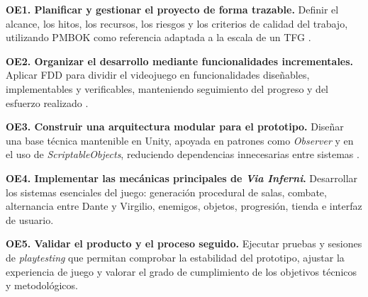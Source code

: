 \begin{description}
    \item \textbf{OE1. Planificar y gestionar el proyecto de forma trazable.} Definir el
    alcance, los hitos, los recursos, los riesgos y los criterios de calidad del trabajo,
    utilizando PMBOK como referencia adaptada a la escala de un TFG \cite{pmbok2021}.

    \item \textbf{OE2. Organizar el desarrollo mediante funcionalidades incrementales.}
    Aplicar FDD para dividir el videojuego en funcionalidades diseñables, implementables y
    verificables, manteniendo seguimiento del progreso y del esfuerzo realizado
    \cite{palmer2002fdd}.

    \item \textbf{OE3. Construir una arquitectura modular para el prototipo.} Diseñar una
    base técnica mantenible en Unity, apoyada en patrones como \textit{Observer} y en el
    uso de \textit{ScriptableObjects}, reduciendo dependencias innecesarias entre sistemas
    \cite{gamma1994designpatterns,unityScriptableObject}.

    \item \textbf{OE4. Implementar las mecánicas principales de \textit{Via Inferni}.}
    Desarrollar los sistemas esenciales del juego: generación procedural de salas,
    combate, alternancia entre Dante y Virgilio, enemigos, objetos, progresión,
    tienda e interfaz de usuario.

    \item \textbf{OE5. Validar el producto y el proceso seguido.} Ejecutar pruebas y
    sesiones de \textit{playtesting} que permitan comprobar la estabilidad del prototipo,
    ajustar la experiencia de juego y valorar el grado de cumplimiento de los objetivos
    técnicos y metodológicos.
\end{description}
